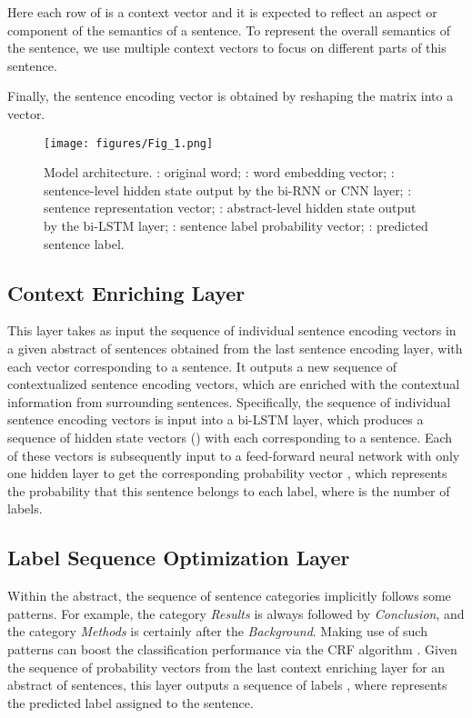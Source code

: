 \documentclass[11pt,a4paper]{article}
\begin{document}
Here each row of  is a context vector  and it is expected to reflect an aspect or component of the semantics of a sentence. To represent the overall semantics of the sentence, we use multiple context vectors to focus on different parts of this sentence. 


Finally, the sentence encoding vector  is obtained by reshaping the matrix  into a vector.

\begin{figure}[h!]
\begin{center}
\texttt{[image: figures/Fig\_1.png]}
\caption{Model architecture. : original word; : word embedding vector; : sentence-level hidden state output by the bi-RNN or CNN layer; : sentence representation vector; : abstract-level hidden state output by the bi-LSTM layer; : sentence label probability vector; : predicted sentence label.}
\label{figure:model}
\end{center}
\end{figure}

\subsection{Context Enriching Layer}

This layer takes as input the sequence of individual sentence encoding vectors in a given abstract of  sentences obtained from the last sentence encoding layer, with each vector corresponding to a sentence. It outputs a new sequence of contextualized sentence encoding vectors, which are enriched with the contextual information from surrounding sentences. Specifically, the sequence of individual sentence encoding vectors is input into a bi-LSTM layer, which produces a sequence of hidden state vectors  () with each corresponding to a sentence. Each of these vectors is subsequently input to a feed-forward neural network with only one hidden layer to get the corresponding probability vector , which represents the probability that this sentence belongs to each label, where  is the number of labels.


\subsection{Label Sequence Optimization Layer}

Within the abstract, the sequence of sentence categories implicitly follows some patterns. For example, the category \textit{Results} is always followed by \textit{Conclusion}, and the category \textit{Methods} is certainly after the \textit{Background}. Making use of such patterns can boost the classification performance via the CRF algorithm \cite{Lample2016NeuralAF}. Given the sequence of probability vectors  from the last context enriching layer for an abstract of  sentences, this layer outputs a sequence of labels , where  represents the predicted label assigned to the  sentence.
\end{document}
